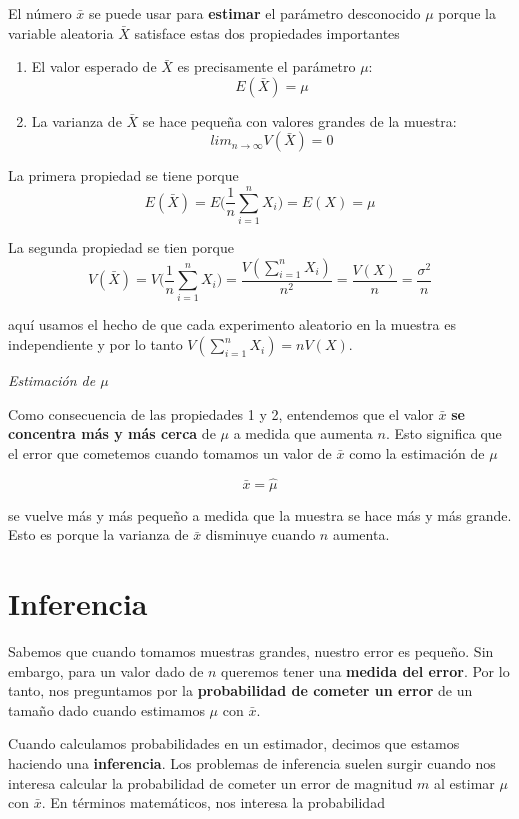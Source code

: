 \documentclass[
]{book}
\begin{document}
El número \(\bar{x}\) se puede usar para \textbf{estimar} el parámetro desconocido \(\mu\) porque la variable aleatoria \(\bar{X}\) satisface estas dos propiedades importantes

\begin{enumerate}
\def\labelenumi{\arabic{enumi})}
\item
  El valor esperado de \(\bar{X}\) es precisamente el parámetro \(\mu\): \[E(\bar{X})=\mu\]
\item
  La varianza de \(\bar{X}\) se hace pequeña con valores grandes de la muestra: \[lim_{n \rightarrow \infty} V(\bar{X}) = 0\]
\end{enumerate}

La primera propiedad se tiene porque
\[E(\bar{X})=E\big(\frac{1}{n}\sum_{i=1}^n X_i\big)=E(X)=\mu\]

La segunda propiedad se tien porque
\[V(\bar{X})=V\big(\frac{1}{n}\sum_{i=1}^n X_i\big)=\frac{V(\sum_{i=1}^ nX_i)}{n^2}=\frac{V(X)}{n}=\frac{\sigma^2}{n}\]

aquí usamos el hecho de que cada experimento aleatorio en la muestra es independiente y por lo tanto \(V(\sum_{i=1}^n X_i)=nV(X)\).

\emph{Estimación de \(\mu\)}

Como consecuencia de las propiedades 1 y 2, entendemos que el valor \(\bar{x}\) \textbf{se concentra más y más cerca} de \(\mu\) a medida que aumenta \(n\). Esto significa que el error que cometemos cuando tomamos un valor de \(\bar{x}\) como la estimación de \(\mu\)

\[\bar{x}=\hat{\mu}\]

se vuelve más y más pequeño a medida que la muestra se hace más y más grande. Esto es porque la varianza de \(\bar{x}\) disminuye cuando \(n\) aumenta.

\hypertarget{inferencia}{%
\section{Inferencia}\label{inferencia}}

Sabemos que cuando tomamos muestras grandes, nuestro error es pequeño. Sin embargo, para un valor dado de \(n\) queremos tener una \textbf{medida del error}. Por lo tanto, nos preguntamos por la \textbf{probabilidad de cometer un error} de un tamaño dado cuando estimamos \(\mu\) con \(\bar{x}\).

Cuando calculamos probabilidades en un estimador, decimos que estamos haciendo una \textbf{inferencia}. Los problemas de inferencia suelen surgir cuando nos interesa calcular la probabilidad de cometer un error de magnitud \(m\) al estimar \(\mu\) con \(\bar{x}\). En términos matemáticos, nos interesa la probabilidad
\end{document}
